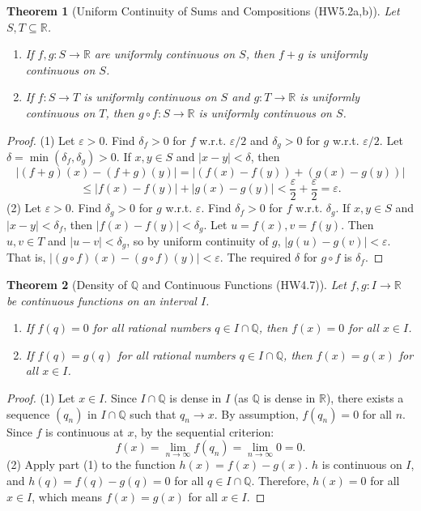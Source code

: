\documentclass{article}
\theoremstyle{definition}
\theoremstyle{plain}
\newtheorem{theorem}{Theorem}[section]
\theoremstyle{remark}
\newcommand{\R}{\mathbb{R}}
\newcommand{\Q}{\mathbb{Q}}
\newcommand{\eps}{\varepsilon}
\begin{document}
\begin{theorem}[Uniform Continuity of Sums and Compositions (HW5.2a,b)] \label{thm:uc_ops}
Let \(S, T \subseteq \R\).
\begin{enumerate}
    \item If \(f, g: S \to \R\) are uniformly continuous on \(S\), then \(f+g\) is uniformly continuous on \(S\).
    \item If \(f: S \to T\) is uniformly continuous on \(S\) and \(g: T \to \R\) is uniformly continuous on \(T\), then \(g \circ f: S \to \R\) is uniformly continuous on \(S\).
\end{enumerate}
\end{theorem}
\begin{proof}
(1) Let \(\eps > 0\). Find \(\delta_f > 0\) for \(f\) w.r.t. \(\eps/2\) and \(\delta_g > 0\) for \(g\) w.r.t. \(\eps/2\). Let \(\delta = \min(\delta_f, \delta_g) > 0\). If \(x, y \in S\) and \(|x-y|< \delta\), then
\[ |(f+g)(x) - (f+g)(y)| = |(f(x)-f(y)) + (g(x)-g(y))| \]
\[ \le |f(x)-f(y)| + |g(x)-g(y)| < \frac{\eps}{2} + \frac{\eps}{2} = \eps. \]
(2) Let \(\eps > 0\). Find \(\delta_g > 0\) for \(g\) w.r.t. \(\eps\). Find \(\delta_f > 0\) for \(f\) w.r.t. \(\delta_g\). If \(x,y \in S\) and \(|x-y| < \delta_f\), then \(|f(x)-f(y)| < \delta_g\). Let \(u=f(x), v=f(y)\). Then \(u, v \in T\) and \(|u-v| < \delta_g\), so by uniform continuity of \(g\), \(|g(u)-g(v)| < \eps\). That is, \(|(g \circ f)(x) - (g \circ f)(y)| < \eps\). The required \(\delta\) for \(g \circ f\) is \(\delta_f\).
\end{proof}

\begin{theorem}[Density of \(\Q\) and Continuous Functions (HW4.7)] \label{thm:dense_cont}
Let \(f, g: I \to \R\) be continuous functions on an interval \(I\).
\begin{enumerate}
    \item If \(f(q) = 0\) for all rational numbers \(q \in I \cap \Q\), then \(f(x) = 0\) for all \(x \in I\).
    \item If \(f(q) = g(q)\) for all rational numbers \(q \in I \cap \Q\), then \(f(x) = g(x)\) for all \(x \in I\).
\end{enumerate}
\end{theorem}
\begin{proof}
(1) Let \(x \in I\). Since \(I \cap \Q\) is dense in \(I\) (as \(\Q\) is dense in \(\R\)), there exists a sequence \((q_n)\) in \(I \cap \Q\) such that \(q_n \to x\). By assumption, \(f(q_n) = 0\) for all \(n\). Since \(f\) is continuous at \(x\), by the sequential criterion:
\[ f(x) = \lim_{n\to\infty} f(q_n) = \lim_{n\to\infty} 0 = 0. \]
(2) Apply part (1) to the function \(h(x) = f(x) - g(x)\). \(h\) is continuous on \(I\), and \(h(q) = f(q) - g(q) = 0\) for all \(q \in I \cap \Q\). Therefore, \(h(x) = 0\) for all \(x \in I\), which means \(f(x) = g(x)\) for all \(x \in I\).
\end{proof}
\end{document}
